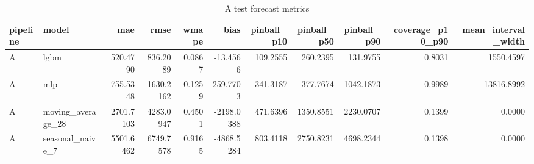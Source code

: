 \begin{table}
\caption{A test forecast metrics}
\label{tab:metrics-A}
\begin{tabular}{llrrrrrrrrr}
\toprule
pipeline & model & mae & rmse & wmape & bias & pinball\_p10 & pinball\_p50 & pinball\_p90 & coverage\_p10\_p90 & mean\_interval\_width \\
\midrule
A & lgbm & 520.4790 & 836.2089 & 0.0867 & -13.4566 & 109.2555 & 260.2395 & 131.9755 & 0.8031 & 1550.4597 \\
A & mlp & 755.5348 & 1630.2162 & 0.1259 & 259.7703 & 341.3187 & 377.7674 & 1042.1873 & 0.9989 & 13816.8992 \\
A & moving\_average\_28 & 2701.7103 & 4283.0947 & 0.4501 & -2198.0388 & 471.6396 & 1350.8551 & 2230.0707 & 0.1399 & 0.0000 \\
A & seasonal\_naive\_7 & 5501.6462 & 6749.7578 & 0.9165 & -4868.5284 & 803.4118 & 2750.8231 & 4698.2344 & 0.1398 & 0.0000 \\
\bottomrule
\end{tabular}
\end{table}
